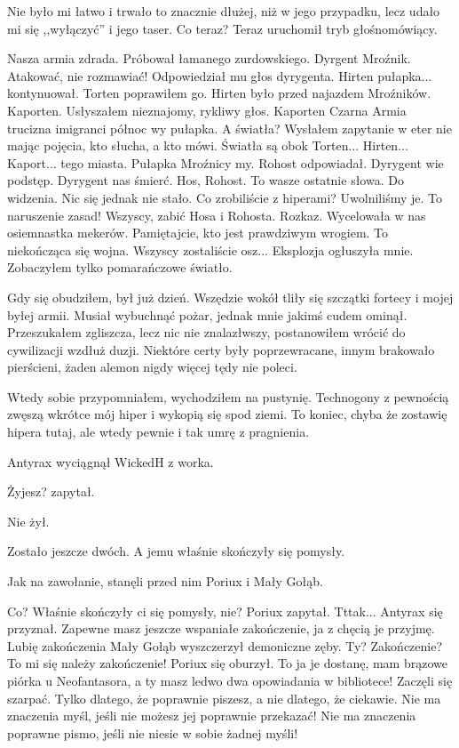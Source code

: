 Nie było mi łatwo i trwało to znacznie dłużej, niż w jego przypadku, lecz udało mi się ,,wyłączyć'' i jego taser.
Co teraz?
Teraz uruchomił tryb głośnomówiący.
\begin{dialogue}
\ds{} Nasza armia zdrada. \dm{} Próbował łamanego zurdowskiego. \dm{} Dyrgent Mroźnik.
\ds{} Atakować, nie rozmawiać! \dm{} Odpowiedział mu głos dyrygenta.
\ds{} Hirten pułapka... \dm{} kontynuował.
\ds{} Torten \dm{} poprawiłem go. \dm{} Hirten było przed najazdem Mroźników.
\ds{} Kaporten. \dm{} Usłyszałem nieznajomy, rykliwy głos. \dm{} Kaporten Czarna Armia trucizna imigranci północ wy pułapka.
\ds{} A światła? \dm{} Wysłałem zapytanie w eter nie mając pojęcia, kto słucha, a kto mówi. \dm{} Światła są obok Torten... Hirten... Kaport... tego miasta.
\ds{} Pułapka Mroźnicy my. \dm{} Rohost odpowiadał. \dm{} Dyrygent wie podstęp. Dyrygent nas śmierć.
\ds{} Hos, Rohost. To wasze ostatnie słowa. Do widzenia. \dm{} Nic się jednak nie stało. \dm{} Co zrobiliście z hiperami?
\ds{} Uwolniliśmy je. 
\ds{} To naruszenie zasad! Wszyscy, zabić Hosa i Rohosta. Rozkaz. \dm{} Wycelowała w nas osiemnastka mekerów.
\ds{} Pamiętajcie, kto jest prawdziwym wrogiem. To niekończąca się wojna. Wszyscy zostaliście osz... \dm{} Eksplozja ogłuszyła mnie. Zobaczyłem tylko pomarańczowe światło.
\end{dialogue}

Gdy się obudziłem, był już dzień. Wszędzie wokół tliły się szczątki fortecy i mojej byłej armii.
Musiał wybuchnąć pożar, jednak mnie jakimś cudem ominął.
Przeszukałem zgliszcza, lecz nic nie znalazłwszy, postanowiłem wrócić do cywilizacji wzdłuż duzji. 
Niektóre certy były poprzewracane, innym brakowało pierścieni, żaden alemon nigdy więcej tędy nie poleci.

Wtedy sobie przypomniałem, wychodziłem na pustynię. Technogony z pewnością zwęszą wkrótce mój hiper i wykopią się spod ziemi.
To koniec, chyba że zostawię hipera tutaj, ale wtedy pewnie i tak umrę z pragnienia.

\divider{}

Antyrax wyciągnął WickedH z worka.
\begin{dialogue}
\ds{} Żyjesz? \dm{} zapytał. 
\end{dialogue}
Nie żył.

Zostało jeszcze dwóch.
A jemu właśnie skończyły się pomysły.

Jak na zawołanie, stanęli przed nim Poriux i Mały Gołąb.
\begin{dialogue}
\ds{} Co? Właśnie skończyły ci się pomysły, nie? \dm{} Poriux zapytał.
\ds{} Tttak... \dm{} Antyrax się przyznał.
\ds{} Zapewne masz jeszcze wspaniałe zakończenie, ja z chęcią je przyjmę. Lubię zakończenia \dm{} Mały Gołąb wyszczerzył demoniczne zęby.
\ds{} Ty? Zakończenie? To mi się należy zakończenie! \dm{} Poriux się oburzył.
\ds{} To ja je dostanę, mam brązowe piórka u Neofantasora, a ty masz ledwo dwa opowiadania w bibliotece! \dm{} Zaczęli się szarpać.
\ds{} Tylko dlatego, że poprawnie piszesz, a nie dlatego, że ciekawie.
\ds{} Nie ma znaczenia myśl, jeśli nie możesz jej poprawnie przekazać!
\ds{} Nie ma znaczenia poprawne pismo, jeśli nie niesie w sobie żadnej myśli!
\end{dialogue}

